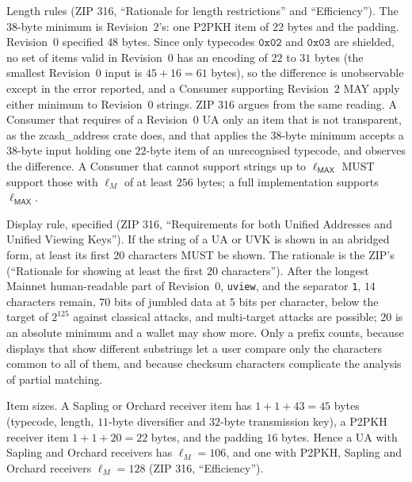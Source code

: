 \documentclass[11pt,a4paper]{article}
\theoremstyle{definition}
\begin{document}
Length rules (ZIP 316, ``Rationale for length restrictions'' and
``Efficiency''). The $38$-byte minimum is Revision~$2$'s: one P2PKH item of
$22$ bytes and the padding. Revision~$0$ specified $48$ bytes. Since only
typecodes $\mathtt{0x02}$ and $\mathtt{0x03}$ are shielded, no set of items
valid in Revision~$0$ has an encoding of $22$ to $31$ bytes (the smallest
Revision~$0$ input is $45 + 16 = 61$ bytes), so the difference is
unobservable except in the error reported, and a Consumer supporting
Revision~$2$ MAY apply either minimum to Revision~$0$ strings. ZIP 316
argues from the same reading. A Consumer that requires of a Revision~$0$
UA only an item that is not transparent, as the \textsf{zcash\_address}
crate does, and that applies the $38$-byte minimum accepts a $38$-byte input
holding one $22$-byte item of an unrecognised typecode, and observes the
difference. A Consumer
that cannot support strings up to $\ell_{\mathsf{MAX}}$ MUST support those
with $\ell_M$ of at least $256$ bytes; a full implementation supports
$\ell_{\mathsf{MAX}}$.

Display rule, specified (ZIP 316, ``Requirements for both Unified Addresses
and Unified Viewing Keys''). If the string of a UA or UVK is shown in an
abridged form, at least its first $20$ characters MUST be shown. The
rationale is the ZIP's (``Rationale for showing at least the first 20
characters''). After the longest Mainnet human-readable part of
Revision~$0$, \texttt{uview}, and the separator \texttt{1}, $14$ characters
remain, $70$ bits of jumbled data at $5$ bits per character, below the
target of $2^{125}$ against classical attacks, and multi-target attacks are
possible; $20$ is an absolute minimum and a wallet may show more. Only a
prefix counts, because displays that show different substrings let a user
compare only the characters common to all of them, and because checksum
characters complicate the analysis of partial matching.

Item sizes. A Sapling or Orchard receiver item has $1 + 1 + 43 = 45$ bytes
(typecode, length, $11$-byte diversifier and $32$-byte transmission key), a
P2PKH receiver item $1 + 1 + 20 = 22$ bytes, and the padding $16$ bytes.
Hence a UA with Sapling and Orchard receivers has $\ell_M = 106$, and one
with P2PKH, Sapling and Orchard receivers $\ell_M = 128$ (ZIP 316,
``Efficiency'').
\end{document}
